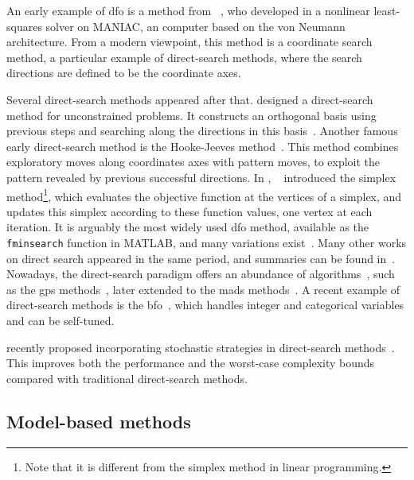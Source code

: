 An early example of \gls{dfo} is a method from \citeauthor{Fermi_Metropolis_1952}~\cite{Fermi_Metropolis_1952}, who developed in \citeyear{Fermi_Metropolis_1952} a nonlinear least-squares solver on MANIAC, an computer based on the von Neumann architecture.
From a modern viewpoint, this method is a coordinate search method, a particular example of direct-search methods, where the search directions are defined to be the coordinate axes.

Several direct-search methods appeared after that.
\citeauthor{Rosenbrock_1960} designed a direct-search method for unconstrained problems.
It constructs an orthogonal basis using previous steps and searching along the directions in this basis~\cite{Rosenbrock_1960}.
Another famous early direct-search method is the Hooke-Jeeves method~\cite{Hooke_Jeeves_1961}.
This method combines exploratory moves along coordinates axes with pattern moves, to exploit the pattern revealed by previous successful directions.
In \citeyear{Nelder_Mead_1965}, \citeauthor{Nelder_Mead_1965}~\cite{Nelder_Mead_1965} introduced the simplex method\footnote{Note that it is different from the simplex method in linear programming.}, which evaluates the objective function at the vertices of a simplex, and updates this simplex according to these function values, one vertex at each iteration.
It is arguably the most widely used \gls{dfo} method, available as the \verb|fminsearch| function in MATLAB, and many variations exist~\cite{Wright_2012}.
Many other works on direct search appeared in the same period, and summaries can be found in~\cite{Fletcher_1965,Box_1966}.
Nowadays, the direct-search paradigm offers an abundance of algorithms~\cite{Kolda_Lewis_Torczon_2003}, such as the \gls{gps} methods~\cite{Booker_Etal_1999}, later extended to the \gls{mads} methods~\cite{Audet_Dennis_2006,Abramson_Audet_2006,Abramson_Etal_2009,Audet_Dennis_Digabel_2008,Digabel_2011}.
A recent example of direct-search methods is the \gls{bfo}~\cite{Porcelli_Toint_2017,Porcelli_Toint_2022}, which handles integer and categorical variables and can be self-tuned.

 recently proposed incorporating stochastic strategies in direct-search methods~\cite{Gratton_Etal_2015,Gratton_Etal_2019}.
This improves both the performance and the worst-case complexity bounds compared with traditional direct-search methods.

\subsection{Model-based methods}
\label{subsec:model-based-methods}

